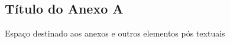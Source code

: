 \begin{anexosenv}
\chapter*{Título do Anexo A}

Espaço destinado aos anexos e outros elementos pós textuais


\end{anexosenv}